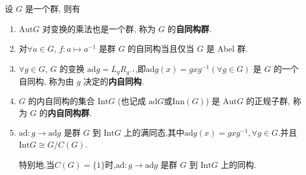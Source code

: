 \documentclass[../../main.tex]{subfiles}%
\begin{document}
\begin{theorem}\label{theorem:内自同构群及其基本性质}
设 \( G \) 是一个群, 则有
\begin{enumerate}[(1)]
\item\label{theorem:内自同构群及其基本性质-1} \( \text{Aut}G \) 对变换的乘法也是一个群, 称为 \( G \) 的\textbf{自同构群}.

\item 对$\forall a\in G$, $f:a\mapsto a^{-1}$ 是群 $G$ 的自同构当且仅当 $G$ 是 Abel 群.

\item\label{theorem:内自同构群及其基本性质-2} \( \forall g \in G \), \( G \) 的变换 \( \text{ad}g = L_gR_{g^{-1}} \),即$\text{ad}g(x)=gxg^{-1}(\forall g\in G)$ 是 \( G \) 的一个自同构, 称为由 \( g \) 决定的\textbf{内自同构}.

\item\label{theorem:内自同构群及其基本性质-3} \( G \) 的内自同构的集合 \( \text{Int}G \) (也记成 \( \text{ad}G \)或$\text{Inn}(G)$) 是 \( \text{Aut}G \) 的正规子群, 称为 \( G \) 的\textbf{内自同构群}.

\item\label{theorem:内自同构群及其基本性质-4} \( \text{ad}: g \to \text{ad}g \) 是群 \( G \) 到 \( \text{Int}G \) 上的满同态,其中$\text{ad}g(x)=gxg^{-1},\forall g\in G$.并且$\text{Int}G\cong G/C(G).$

特别地,当$C(G)=\{1\}$时,\( \text{ad}: g \to \text{ad}g \) 是群 \( G \) 到 \( \text{Int}G \) 上的同构.
\end{enumerate}
\end{theorem}
\end{document}
